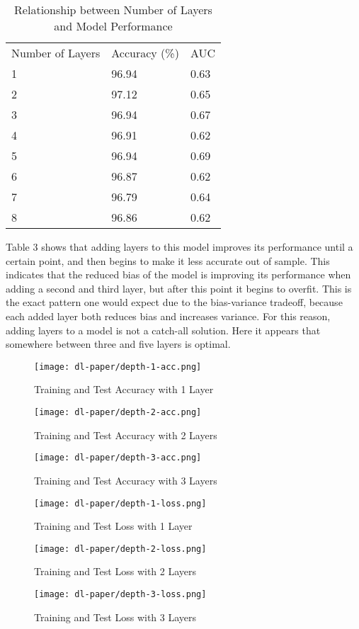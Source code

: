 \documentclass[12pt]{article}  %
\theoremstyle{definition}
\theoremstyle{remark}
\begin{document}
\begin{table}[!h]
\centering
\caption{Relationship between Number of Layers and Model Performance}
\label{my-label}
\begin{tabular}{lll}
Number of Layers & Accuracy (\%) & AUC  \\
1                & 96.94         & 0.63 \\
2                & 97.12         & 0.65 \\
3                & 96.94         & 0.67 \\
4                & 96.91         & 0.62 \\
5                & 96.94         & 0.69 \\
6                & 96.87         & 0.62 \\
7                & 96.79         & 0.64 \\
8                & 96.86         & 0.62
\end{tabular}
\end{table}

\par Table 3 shows that adding layers to this model improves its performance until a certain point, and then begins to make it less accurate out of sample. This indicates that the reduced bias of the model is improving its performance when adding a second and third layer, but after this point it begins to overfit. This is the exact pattern one would expect due to the bias-variance tradeoff, because each added layer both reduces bias and increases variance. For this reason, adding layers to a model is not a catch-all solution. Here it appears that somewhere between three and five layers is optimal. 

\begin{figure}[!h]
  \texttt{[image: dl-paper/depth-1-acc.png]}
  \caption{Training and Test Accuracy with 1 Layer}\label{1-layer}
\endminipage\hfill
{}
  \texttt{[image: dl-paper/depth-2-acc.png]}
  \caption{Training and Test Accuracy with 2 Layers}\label{2-layers}
\endminipage\hfill
{}%
  \texttt{[image: dl-paper/depth-3-acc.png]}
  \caption{Training and Test Accuracy with 3 Layers}\label{3-layers}
\endminipage
\end{figure}


\begin{figure}[!h]
  \texttt{[image: dl-paper/depth-1-loss.png]}
  \caption{Training and Test Loss with 1 Layer}\label{1-layers}
\endminipage\hfill
{}
  \texttt{[image: dl-paper/depth-2-loss.png]}
  \caption{Training and Test Loss with 2 Layers}\label{2-layers}
\endminipage\hfill
{}%
  \texttt{[image: dl-paper/depth-3-loss.png]}
  \caption{Training and Test Loss with 3 Layers}\label{3-layers}
\endminipage
\end{figure}
\end{document}
